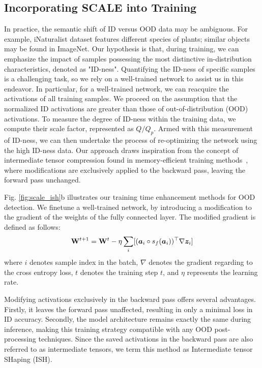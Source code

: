 \documentclass{article} %
\theoremstyle{plain}
\newcommand{\logit}{\vz}  %
\newcommand{\pF}{\va}     %
\begin{document}
\subsection{Incorporating SCALE into Training}
In practice, the semantic shift of ID versus OOD data may be ambiguous.  
For example, iNaturalist dataset features different species of plants; similar objects may be found in ImageNet. 
Our hypothesis is that, during training, we can emphasize the impact of samples possessing the most distinctive in-distribution characteristics, denoted as "ID-ness". Quantifying the ID-ness of specific samples is a challenging task, so we rely on a well-trained network to assist us in this endeavor. In particular, for a well-trained network, we can reacquire the activations of all training samples. We proceed on the assumption that the normalized ID activations are greater than those of out-of-distribution (OOD) activations. To measure the degree of ID-ness within the training data, we compute their scale factor, represented as ${Q}/{Q_p}$. Armed with this measurement of ID-ness, we can then undertake the process of re-optimizing the network using the high ID-ness data. Our approach draws inspiration from the concept of intermediate tensor compression found in memory-efficient training methods~\citep{DBLP:conf/iclr/ChenXWCY23/DropIT}, where modifications are exclusively applied to the backward pass, leaving the forward pass unchanged.

Fig. \ref{fig:scale_ish}b illustrates our training time enhancement methods for OOD detection. We finetune a well-trained network, by introducing a modification to the gradient of the weights of the fully connected layer. The modified gradient is defined as follows:
\begin{equation}
 \mathbf{W}^{t+1} = \mathbf{W}^t - \eta \sum_i [(\pF_i\circ s_f(\pF_i))^{\top}\nabla{\logit_i}  ]
\end{equation} 
where $i$ denotes sample index in the batch, $\nabla$ denotes the gradient regarding to the cross entropy loss, $t$ denotes the training step $t$, and $\eta$ represents the learning rate.

Modifying activations exclusively in the backward pass offers several advantages. Firstly, it leaves the forward pass unaffected, resulting in only a minimal loss in ID accuracy. Secondly, the model architecture remains exactly the same during inference, making this training strategy compatible with any OOD post-processing techniques. Since the saved activations in the backward pass are also referred to as intermediate tensors, we term this method as Intermediate tensor SHaping (ISH).
\end{document}
